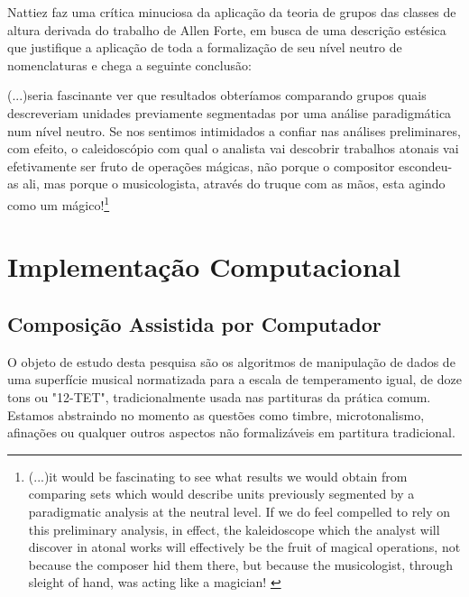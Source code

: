 \documentclass[
	12pt,				%
	openright,			%
	twoside,			%
	a4paper,			%
	english,			%
	french,				%
	spanish,			%
	brazil				%
	]{abntex2}
\begin{document}
Nattiez\cite{nattiez2003allen} faz uma crítica minuciosa da aplicação da teoria de grupos das classes de altura derivada do trabalho de Allen Forte, em busca de uma descrição estésica que justifique a aplicação de toda a formalização de seu nível neutro de nomenclaturas e chega a seguinte conclusão:


\begin{citacao}
(...)seria fascinante ver que resultados obteríamos comparando grupos quais descreveriam unidades previamente segmentadas por uma análise paradigmática num nível neutro. Se nos sentimos intimidados a confiar nas análises preliminares, com efeito, o caleidoscópio com qual o analista vai descobrir trabalhos atonais vai efetivamente ser fruto de operações mágicas, não porque o compositor escondeu-as ali, mas porque o musicologista, através do truque com as mãos, esta agindo como um mágico!\cite[ p.16]{nattiez2003allen}\footnote{(...)it would be fascinating to see what results we would obtain from comparing sets which would describe units previously segmented by a paradigmatic analysis at the neutral level. If we do feel compelled to rely on this preliminary analysis, in effect, the kaleidoscope which the analyst will discover in atonal works will effectively be the fruit of magical operations, not because the composer hid them there, but because the musicologist, through sleight of hand, was acting like a magician!
\cite[ p.16]{nattiez2003allen}}
\end{citacao}






\part{Implementação Computacional}
\label{computacional}


\chapter{Composição Assistida por Computador}

O objeto de estudo desta pesquisa são os algoritmos de manipulação de dados de uma superfície musical normatizada para a escala de temperamento igual, de doze tons ou "12-TET"\cite[ p.76]{sethares2005tuning}, tradicionalmente usada nas partituras da prática comum. Estamos abstraindo no momento as questões como timbre, microtonalismo, afinações ou qualquer outros aspectos não formalizáveis em partitura tradicional. 
\end{document}
